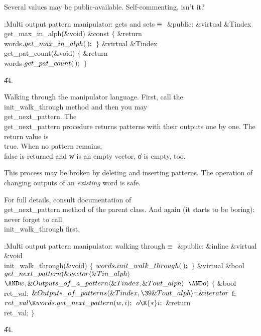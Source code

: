 Several values may be public-available. Self-commenting, isn't it?

\Y\B\4:Multi output pattern manipulator: gets and sets\X${}\equiv{}$\6
\4\&{public}:\6
\&{virtual} \&{Tindex} \\{get\_max\_in\_alph}(\&{void}) \&{const}\1\1\2\2\6
${}\{{}$\1\6
\&{return} \\{words}${}.\\{get\_max\_in\_alph}(\,);{}$\6
\4${}\}{}$\2\7
\&{virtual} \&{Tindex} \\{get\_pat\_count}(\&{void})\1\1\2\2\6
${}\{{}$\1\6
\&{return} \\{words}${}.\\{get\_pat\_count}(\,);{}$\6
\4${}\}{}$\2\par
\U44.\fi

Walking through the manipulator language. First, call the
\\{init\_walk\_through} method and then you may \\{get\_next\_pattern}. The
\\{get\_next\_pattern} procedure returns patterns with their outputs one by
one. The return value is \\{true}. When no pattern remains, \\{false} is
returned and \|w is an empty vector, \|o is empty, too.

This process may be broken by deleting and inserting patterns. The
operation of changing outputs of an {\it existing\/} word is safe.

For full details, consult documentation of \\{get\_next\_pattern} method of
the parent class. And again (it starts to be boring): never forget to
call \\{init\_walk\_through} first.

\Y\B\4:Multi output pattern manipulator: walking through\X${}\equiv{}$\6
\4\&{public}:\6
\&{inline} \&{virtual} \&{void} \\{init\_walk\_through}(\&{void})\1\1\2\2\6
${}\{{}$\1\6
${}\\{words}.\\{init\_walk\_through}(\,);{}$\6
\4${}\}{}$\2\7
\&{virtual} \&{bool} ${}\\{get\_next\_pattern}(\&{vector}\langle\&{Tin\_alph}%
\rangle{}$ ${}{\AND}\|w,\39\&{Outputs\_of\_a\_pattern}\langle\&{Tindex},\39%
\&{Tout\_alph}\rangle{}$ ${}{\AND}\|o){}$\1\1\2\2\6
${}\{{}$\1\6
\&{bool} \\{ret\_val};\6
${}\&{Outputs\_of\_patterns}\langle\&{Tindex},\39\&{Tout\_alph}\rangle\DC%
\&{iterator}{}$ \|i;\7
${}\\{ret\_val}\K\\{words}.\\{get\_next\_pattern}(\|w,\39\|i);{}$\6
${}\|o\K{*}\|i;{}$\6
\&{return} \\{ret\_val};\6
\4${}\}{}$\2\par
\U44.\fi

